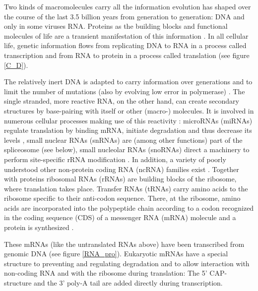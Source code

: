 Two kinds of macromolecules carry all the information evolution has
shaped over the course of the last 3.5 billion years from generation
to generation: DNA and only in some viruses RNA. Proteins as the
building blocks and functional molecules of life are a transient
manifestation of this information \cite{crick1958biological}. In all
cellular life, genetic information flows from replicating DNA to RNA
in a process called transcription and from RNA to protein in a process
called translation \cite{pmid5422595} (see figure \ref{C_D}).

The relatively inert DNA is adapted to carry information over
generations and to limit the number of mutations (also by evolving low
error in polymerase) \cite{pmid21821597}. The single stranded, more
reactive RNA, on the other hand, can create secondary structures by
base-pairing with itself or other (macro-) molecules. It is involved
in numerous cellular processes making use of this reactivity
\cite{pmid21850044}: microRNAs (miRNAs) regulate translation by
binding mRNA, initiate degradation and thus decrease its levels
\cite{pmid20703300,pmid11679654}, small nuclear RNAs (snRNAs) are
(among other functions) part of the spliceosome (see below), small
nucleolar RNAs (snoRNAs) direct a machinery to perform site-specific
rRNA modification \cite{pmid19446021}. In addition, a variety of
poorly understood other non-protein coding RNA (ncRNA) families exist
\cite{pmid16344563}. Together with proteins ribosomal RNAs (rRNAs) are
building blocks of the ribosome, where translation takes
place. Transfer RNAs (tRNAs) carry amino acids to the ribosome
specific to their anti-codon sequence. There, at the ribosome, amino
acids are incorporated into the polypeptide chain according to a codon
recognized in the coding sequence (CDS) of a messenger RNA (mRNA)
molecule and a protein is synthesized \cite{pmid4887876}.

These mRNAs (like the untranslated RNAs above) have been transcribed
from genomic DNA (see figure \ref{RNA_pro}). Eukaryotic mRNAs have a
special structure to preventing and regulating degradation and to
allow interaction with non-coding RNA and with the ribosome during
translation: The 5' CAP-structure and the 3' poly-A tail are added
directly during transcription.


